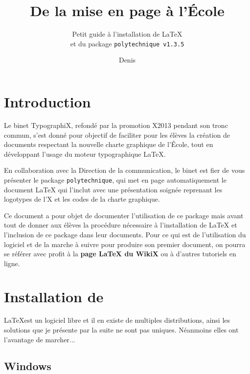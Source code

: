 \documentclass[a4paper,12pt,twoside]{article}
\title{De la mise en page à l'École}
\subtitle{Petit guide à l'installation de \textrm{\LaTeX}\\et du package \textup{\texttt{polytechnique v1.3.5}}}
\author{Denis \bsc{Merigoux}}
\begin{document}
\maketitle

\section{Introduction}

Le binet TypographiX, refondé par la promotion X2013 pendant son tronc commun, s'est donné pour objectif de faciliter pour les élèves la création de documents respectant la nouvelle charte graphique de l'École, tout en développant l'usage du moteur typographique \LaTeX.

En collaboration avec la Direction de la communication, le binet est fier de vous présenter le package \texttt{polytechnique}, qui met en page automatiquement le document \LaTeX{} qui l'inclut avec une présentation soignée reprenant les logotypes de l'X et les codes de la charte graphique.

Ce document a pour objet de documenter l'utilisation de ce package mais avant tout de donner aux élèves la procédure nécessaire à l'installation de \LaTeX{} et l'inclusion de ce package dans leur documents. Pour ce qui est de l'utilisation du logiciel et de la marche à suivre pour produire son premier document, on pourra se référer avec profit à la \textbf{page LaTeX du WikiX} ou à d'autres tutoriels en ligne.

\section{Installation de \rmfamily{\LaTeX}}

\LaTeX est un logiciel libre et il en existe de multiples distributions, ainsi les solutions que je présente par la suite ne sont pas uniques. Néanmoins elles ont l'avantage de marcher...

\subsection{Windows}
\end{document}
